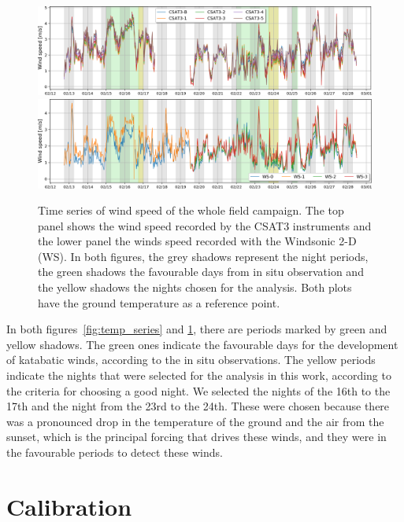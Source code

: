 \begin{figure}
  \centering
  {
  \includegraphics[width=1\textwidth]{fig/chapter_4/wind_speed_csat_series.png} \\
   \includegraphics[width=1\textwidth]{fig/chapter_4/wind_speed_ws_series.png}
   }
  \caption{Time series of wind speed of the whole field campaign. The top panel shows the wind speed recorded by the CSAT3 instruments and the lower panel the winds speed recorded with the Windsonic 2-D (WS). In both figures, the grey shadows represent the night periods, the green shadows the favourable days from in situ observation and the yellow shadows the nights chosen for the analysis. Both plots have the ground temperature as a reference point.}
  \label{fig:windspeed_series}
\end{figure}

In both figures~\ref{fig:temp_series} and \ref{fig:windspeed_series}, there are periods marked by green and yellow shadows. The green ones indicate the favourable days for the development of katabatic winds, according to the in situ observations. The yellow periods indicate the nights that were selected for the analysis in this work, according to the criteria for choosing a good night. We selected the nights of the 16th to the 17th and the night from the 23rd to the 24th. These were chosen because there was a pronounced drop in the temperature of the ground and the air from the sunset, which is the principal forcing that drives these winds, and they were in the favourable periods to detect these winds.

\section{Calibration}

